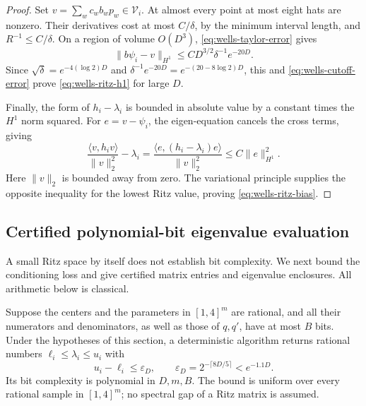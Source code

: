 \begin{proof}
Set \(v=\sum_w c_wb_wp_w\in\mathcal V_i\).
At almost every point at most eight hats are nonzero. Their derivatives
cost at most \(C/\delta\), by the minimum interval length, and
\(R^{-1}\le C/\delta\).
On a region of volume \(O(D^3)\), \eqref{eq:wells-taylor-error} gives
\[
 \|b\psi_i-v\|_{H^1}\le C D^{3/2}\delta^{-1}e^{-20D}.
\]
Since \(\sqrt\delta=e^{-4(\log2)D}\) and
\(\delta^{-1}e^{-20D}=e^{-(20-8\log2)D}\),
this and \eqref{eq:wells-cutoff-error} prove
\eqref{eq:wells-ritz-h1} for large \(D\).

Finally, the form of \(h_i-\lambda_i\) is bounded in absolute value
by a constant times the \(H^1\) norm squared. For \(e=v-\psi_i\),
the eigen-equation cancels the cross terms, giving
\[
 \frac{\langle v,h_iv\rangle}{\|v\|_2^2}-\lambda_i
 =\frac{\langle e,(h_i-\lambda_i)e\rangle}{\|v\|_2^2}
 \le C\|e\|_{H^1}^2.
\]
Here \(\|v\|_2\) is bounded away from zero.
The variational principle supplies the opposite inequality for the
lowest Ritz value, proving \eqref{eq:wells-ritz-bias}.
\end{proof}

\subsection{Certified polynomial-bit eigenvalue evaluation}

A small Ritz space by itself does not establish bit complexity.
We next bound the conditioning loss and give certified matrix
entries and eigenvalue enclosures. All arithmetic below is classical.

\begin{proposition}
\label{prop:ritz-oracle}
Suppose the centers and the parameters in \([1,4]^m\) are rational,
and all their numerators and denominators, as well as those of
\(q,q'\), have at most \(B\) bits. Under the hypotheses of this section,
a deterministic algorithm returns rational numbers
\(\ell_i\le\lambda_i\le u_i\) with
\begin{equation}
 u_i-\ell_i\le\varepsilon_D,\qquad
 \varepsilon_D=2^{-\lceil8D/5\rceil}<e^{-1.1D}.
 \label{eq:wells-oracle-precision}
\end{equation}
Its bit complexity is polynomial in \(D,m,B\).
The bound is uniform over every rational sample in \([1,4]^m\);
no spectral gap of a Ritz matrix is assumed.
\end{proposition}

